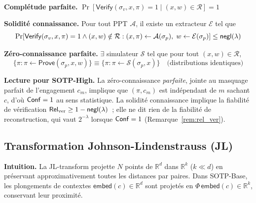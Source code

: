 \begin{sloppypar}
\begin{definition}
\noindent\textbf{Complétude parfaite.}
$\Pr[\mathsf{Verify}(\sigma_v,x,\pi)=1 \;|\; (x,w)\in\mathcal{R}] = 1$

\noindent\textbf{Solidité connaissance.} Pour tout PPT $\mathcal{A}$,
il existe un extracteur $\mathcal{E}$ tel que
\begin{equation}
\Pr\!\left[
\mathsf{Verify}(\sigma_v,x,\pi)=1 \land (x,w)\notin\mathcal{R} :
(x,\pi)\leftarrow\mathcal{A}(\sigma_p),\; w\leftarrow\mathcal{E}(\sigma_p)
\right] \leq \mathsf{negl}(\lambda)
\end{equation}

\noindent\textbf{Zéro-connaissance parfaite.}
$\exists$ simulateur $\mathcal{S}$ tel que pour tout $(x,w)\in\mathcal{R}$,
\begin{equation}
\{\pi : \pi \leftarrow \mathsf{Prove}(\sigma_p,x,w)\}
\equiv
\{\pi : \pi \leftarrow \mathcal{S}(\sigma_p,x)\}
\quad\text{(distributions identiques)}
\end{equation}
\end{definition}

\noindent\textbf{Lecture pour SOTP-High.} La z\'ero-connaissance
\emph{parfaite}, jointe au masquage parfait de l'engagement $c_m$, implique que
$(\pi, c_m)$ est ind\'ependant de $m$ sachant $c$, d'o\`u $\mathsf{Conf} = 1$ au sens statistique.
La solidit\'e connaissance implique la fiabilit\'e de v\'erification
$\mathsf{Rel}_{\mathrm{ver}} \geq 1 - \mathsf{negl}(\lambda)$~; elle ne dit rien de la fiabilit\'e de
reconstruction, qui vaut $2^{-\lambda}$ lorsque $\mathsf{Conf} = 1$
(Remarque~\ref{rem:rel_ver}).

\subsection{Transformation Johnson-Lindenstrauss (JL)}

\noindent\textbf{Intuition.} La JL-transform projette $N$ points de
$\mathbb{R}^d$ dans $\mathbb{R}^k$ ($k \ll d$) en pr\'eservant
approximativement toutes les distances par paires. Dans SOTP-Base,
les plongements de contextes $\mathsf{embed}(c) \in \mathbb{R}^d$ sont projet\'es en
$\Phi\,\mathsf{embed}(c) \in \mathbb{R}^k$, conservant leur proximit\'e.


\end{sloppypar}
